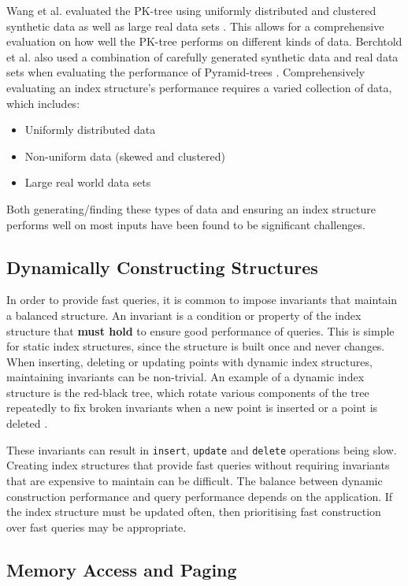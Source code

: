 Wang et al. evaluated the PK-tree using uniformly distributed and clustered synthetic data as well as large real data sets \cite{pk-tree}. This allows for a comprehensive evaluation on how well the PK-tree performs on different kinds of data. Berchtold et al. also used a combination of carefully generated synthetic data and real data sets when evaluating the performance of Pyramid-trees \cite{pyramid-tree}. 
Comprehensively evaluating an index structure's performance requires a varied collection of data, which includes:
\begin{itemize}
	\item Uniformly distributed data
	\item Non-uniform data (skewed and clustered)
	\item Large real world data sets
\end{itemize}	
Both generating/finding these types of data and ensuring an index structure performs well on most inputs have been found to be significant challenges.

\subsection{Dynamically Constructing Structures}

In order to provide fast queries, it is common to impose invariants that maintain a balanced structure. An invariant is a condition or property of the index structure that \textbf{must hold} to ensure good performance of queries. This is simple for static index structures, since the structure is built once and never changes. When inserting, deleting or updating points with dynamic index structures, maintaining invariants can be non-trivial. An example of a dynamic index structure is the red-black tree, which rotate various components of the tree repeatedly to fix broken invariants when a new point is inserted or a point is deleted \cite{introduction-to-algorithms}.

These invariants can result in \texttt{insert}, \texttt{update} and \texttt{delete} operations being slow. Creating index structures that provide fast queries without requiring invariants that are expensive to maintain can be difficult. The balance between dynamic construction performance and query performance depends on the application. If the index structure must be updated often, then prioritising fast construction over fast queries may be appropriate.

\subsection{Memory Access and Paging}
\label{sec:paging}

